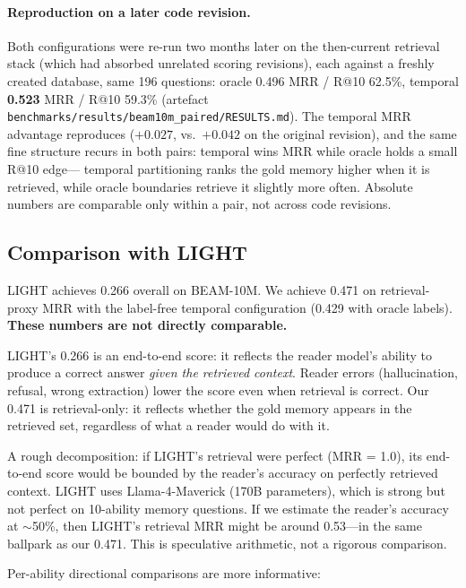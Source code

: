 \documentclass[11pt]{article}
\begin{document}
\paragraph{Reproduction on a later code revision.}
Both configurations were re-run two months later on the
then-current retrieval stack (which had absorbed unrelated scoring
revisions), each against a freshly created database, same 196
questions: oracle 0.496 MRR / R@10 62.5\%, temporal \textbf{0.523}
MRR / R@10 59.3\% (artefact
\texttt{benchmarks/results/beam10m\_paired/RESULTS.md}).  The
temporal MRR advantage reproduces ($+0.027$, vs.\ $+0.042$ on the
original revision), and the same fine structure recurs in both
pairs: temporal wins MRR while oracle holds a small R@10 edge---
temporal partitioning ranks the gold memory higher when it is
retrieved, while oracle boundaries retrieve it slightly more often.
Absolute numbers are comparable only within a pair, not across code
revisions.

\subsection{Comparison with LIGHT}
\label{sec:light-comparison}

LIGHT achieves 0.266 overall on BEAM-10M.  We achieve 0.471 on
retrieval-proxy MRR with the label-free temporal configuration
(0.429 with oracle labels).  \textbf{These numbers are not directly
comparable.}

LIGHT's 0.266 is an end-to-end score: it reflects the reader model's
ability to produce a correct answer \emph{given the retrieved
context}.  Reader errors (hallucination, refusal, wrong extraction)
lower the score even when retrieval is correct.  Our 0.471 is
retrieval-only: it reflects whether the gold memory appears in the
retrieved set, regardless of what a reader would do with it.

A rough decomposition: if LIGHT's retrieval were perfect (MRR = 1.0),
its end-to-end score would be bounded by the reader's accuracy on
perfectly retrieved context.  LIGHT uses Llama-4-Maverick (170B
parameters), which is strong but not perfect on 10-ability memory
questions.  If we estimate the reader's accuracy at $\sim$50\%, then
LIGHT's retrieval MRR might be around 0.53---in the same ballpark as
our 0.471.  This is speculative arithmetic, not a rigorous comparison.

Per-ability directional comparisons are more informative:
\end{document}
